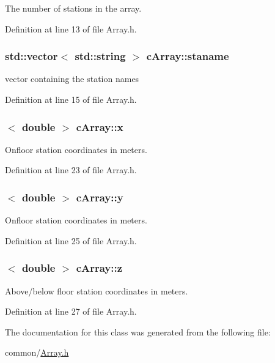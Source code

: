 The number of stations in the array. 



Definition at line 13 of file Array.h.

\hypertarget{classcArray_abec1550010524d5c802f6b3bad7c69fe}{
\subsubsection[{staname}]{\setlength{\rightskip}{0pt plus 5cm}std::vector$<$ std::string $>$ {\bf cArray::staname}}}
\label{classcArray_abec1550010524d5c802f6b3bad7c69fe}


vector containing the station names 



Definition at line 15 of file Array.h.

\hypertarget{classcArray_a7479fa16d4d43f5c8d70e402ae99f198}{
\subsubsection[{x}]{$<$ double $>$ {\bf cArray::x}}}
\label{classcArray_a7479fa16d4d43f5c8d70e402ae99f198}


Onfloor station coordinates in meters. 



Definition at line 23 of file Array.h.

\hypertarget{classcArray_aae5f928d97c8cdd9172a4dbca0e84a73}{
\subsubsection[{y}]{$<$ double $>$ {\bf cArray::y}}}
\label{classcArray_aae5f928d97c8cdd9172a4dbca0e84a73}


Onfloor station coordinates in meters. 



Definition at line 25 of file Array.h.

\hypertarget{classcArray_ae444533f622d7d687ab802229de7ca59}{
\subsubsection[{z}]{$<$ double $>$ {\bf cArray::z}}}
\label{classcArray_ae444533f622d7d687ab802229de7ca59}


Above/below floor station coordinates in meters. 



Definition at line 27 of file Array.h.



The documentation for this class was generated from the following file:\begin{DoxyCompactItemize}
\item 
common/\hyperlink{Array_8h}{Array.h}\end{DoxyCompactItemize}
